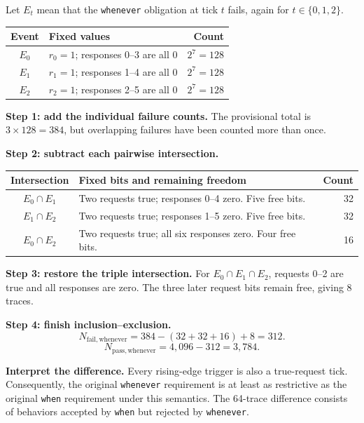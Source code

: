 \documentclass[11pt,a4paper]{article}
\begin{document}
Let \(E_t\) mean that the \texttt{whenever} obligation at tick \(t\) fails, again for \(t\in\{0,1,2\}\).
\begin{center}
\begin{tabular}{cp{89mm}r}
\toprule
Event & Fixed values & Count\\\midrule
\(E_0\) & \(r_0=1\); responses 0--3 are all 0 & \(2^7=128\)\\
\(E_1\) & \(r_1=1\); responses 1--4 are all 0 & \(2^7=128\)\\
\(E_2\) & \(r_2=1\); responses 2--5 are all 0 & \(2^7=128\)\\\bottomrule
\end{tabular}
\end{center}

\textbf{Step 1: add the individual failure counts.} The provisional total is \(3\times128=384\), but overlapping failures have been counted more than once.

\textbf{Step 2: subtract each pairwise intersection.}
\begin{center}
\begin{tabular}{cp{88mm}r}
\toprule
Intersection & Fixed bits and remaining freedom & Count\\\midrule
\(E_0\cap E_1\) & Two requests true; responses 0--4 zero. Five free bits. & 32\\[3pt]
\(E_1\cap E_2\) & Two requests true; responses 1--5 zero. Five free bits. & 32\\[3pt]
\(E_0\cap E_2\) & Two requests true; all six responses zero. Four free bits. & 16\\\bottomrule
\end{tabular}
\end{center}

\textbf{Step 3: restore the triple intersection.} For \(E_0\cap E_1\cap E_2\), requests 0--2 are true and all responses are zero. The three later request bits remain free, giving 8 traces.

\textbf{Step 4: finish inclusion--exclusion.}
\[
N_{\mathrm{fail,whenever}}
=384-(32+32+16)+8=312.
\]
\[
\boxed{N_{\mathrm{pass,whenever}}=4,096-312=3,784.}
\]

\textbf{Interpret the difference.} Every rising-edge trigger is also a true-request tick. Consequently, the original \texttt{whenever} requirement is at least as restrictive as the original \texttt{when} requirement under this semantics. The 64-trace difference consists of behaviors accepted by \texttt{when} but rejected by \texttt{whenever}.
\end{document}
